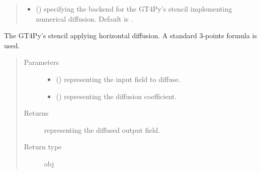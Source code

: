 \documentclass[letterpaper,10pt,english]{sphinxmanual}
\begin{document}
\begin{fulllineitems}
\begin{fulllineitems}
\begin{quote}
\begin{description}
\begin{itemize}
\item {} 
 () \textendash{}  specifying the backend for the GT4Py’s stencil implementing numerical
diffusion. Default is .

\end{itemize}

\end{description}\end{quote}

\end{fulllineitems}


\begin{fulllineitems}
\label{\detokenize{api:dycore.diffusion.DiffusionYZ._defs_stencil}}
The GT4Py’s stencil applying horizontal diffusion. A standard 3-points formula is used.
\begin{quote}\begin{description}
\item[{Parameters}] \leavevmode\begin{itemize}
\item {} 
 () \textendash{}  representing the input field to diffuse.

\item {} 
 () \textendash{}  representing the diffusion coefficient.

\end{itemize}

\item[{Returns}] \leavevmode
{} representing the diffused output field.

\item[{Return type}] \leavevmode
obj

\end{description}\end{quote}

\end{fulllineitems}



\end{fulllineitems}
\end{document}
